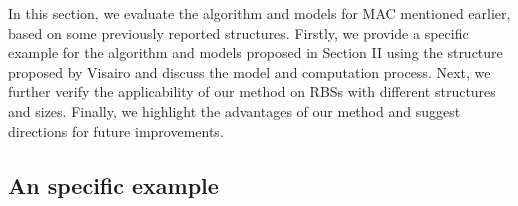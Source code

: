 \documentclass{article}
\begin{document}


In this section, we evaluate the algorithm and models for MAC mentioned earlier, based on some previously reported structures.
Firstly, we provide a specific example for the algorithm and models proposed in Section II using the structure proposed by Visairo and discuss the model and computation process.
Next, we further verify the applicability of our method on RBSs with different structures and sizes.
Finally, we highlight the advantages of our method and suggest directions for future improvements.


\subsection{An specific example}
\end{document}
